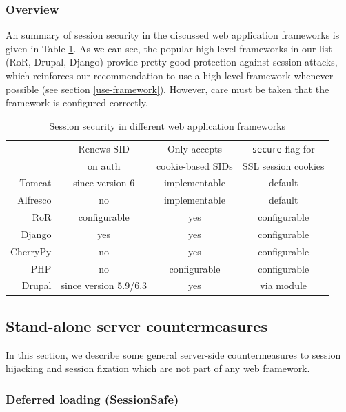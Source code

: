\subsubsection{Overview}

An summary of session security in the discussed web application frameworks is given in Table \ref{tab:frameworks}. As we can see, the popular high-level frameworks in our list (RoR, Drupal, Django) provide pretty good protection against session attacks, which reinforces our recommendation to use a high-level framework whenever possible (see section \ref{use-framework}). However, care must be taken that the framework is configured correctly.

\begin{table}[ht]
	\centering
	\begin{tabular}{r|ccc}
		& Renews SID & Only accepts & \texttt{secure} flag for\\
		& on auth & cookie-based SIDs & SSL session cookies\\
		\hline
		Tomcat & since version 6 & implementable & default\\
		Alfresco & no & implementable & default\\
		RoR & configurable & yes & configurable\\
		Django & yes & yes & configurable\\
		CherryPy & no & yes & configurable\\
		PHP & no & configurable & configurable\\
		Drupal & since version 5.9/6.3 & yes & via module\\
	\end{tabular}
	\caption{Session security in different web application frameworks}
	\label{tab:frameworks}
\end{table}

\subsection{Stand-alone server countermeasures}\label{standalone-server}

In this section, we describe some general server-side countermeasures to session hijacking and session fixation which are not part of any web framework.

\subsubsection{Deferred loading (SessionSafe)}

